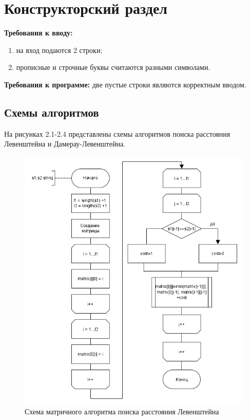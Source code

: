 \chapter{Конструкторский раздел}
\label{cha:design}
\textbf{Требования к вводу:}
\begin{enumerate}[1)]
	\item на вход подаются 2 строки;
	\item прописные и строчные буквы считаются разными символами.
\end{enumerate}
\textbf{Требования к программе:} две пустые строки являются корректным вводом.

\section{Схемы алгоритмов}
На рисунках 2.1-2.4 представлены схемы алгоритмов поиска расстояния Левенштейна и Дамерау-Левенштейна.\\
\label{sec:schemes}
\begin{figure}[H]
	\centering
	\includegraphics[width=0.6\linewidth]{src/Levenstein_m}
	\caption{Схема матричного алгоритма поиска расстояния Левенштейна}
	\label{fig:levensteinm}
\end{figure}
